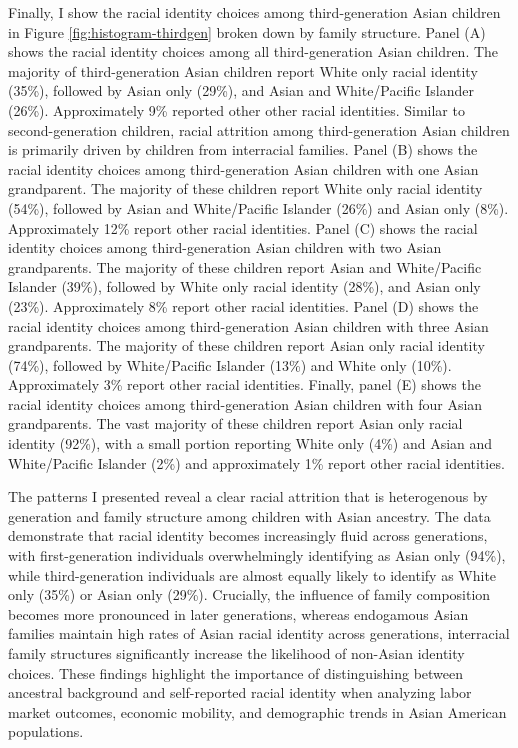 Finally, I show the racial identity choices among third-generation Asian children in Figure \ref{fig:histogram-thirdgen} broken down by family structure. Panel (A) shows the racial identity choices among all third-generation Asian children. The majority of third-generation Asian children report White only racial identity (35\%), followed by Asian only (29\%), and Asian and White/Pacific Islander (26\%). Approximately 9\% reported other other racial identities. Similar to second-generation children, racial attrition among third-generation Asian children is primarily driven by children from interracial families. Panel (B) shows the racial identity choices among third-generation Asian children with one Asian grandparent. The majority of these children report White only racial identity (54\%), followed by Asian and White/Pacific Islander (26\%) and Asian only (8\%). Approximately 12\% report other racial identities. Panel (C) shows the racial identity choices among third-generation Asian children with two Asian grandparents. The majority of these children report Asian and White/Pacific Islander (39\%), followed by White only racial identity (28\%), and Asian only (23\%). Approximately 8\% report other racial identities. Panel (D) shows the racial identity choices among third-generation Asian children with three Asian grandparents. The majority of these children report Asian only racial identity (74\%), followed by White/Pacific Islander (13\%) and White only (10\%). Approximately 3\% report other racial identities. Finally, panel (E) shows the racial identity choices among third-generation Asian children with four Asian grandparents. The vast majority of these children report Asian only racial identity (92\%), with a small portion reporting White only (4\%) and Asian and White/Pacific Islander (2\%) and approximately 1\% report other racial identities.

The patterns I presented reveal a clear racial attrition that is heterogenous by generation and family structure among children with Asian ancestry. The data demonstrate that racial identity becomes increasingly fluid across generations, with first-generation individuals overwhelmingly identifying as Asian only (94\%), while third-generation individuals are almost equally likely to identify as White only (35\%) or Asian only (29\%). Crucially, the influence of family composition becomes more pronounced in later generations, whereas endogamous Asian families maintain high rates of Asian racial identity across generations, interracial family structures significantly increase the likelihood of non-Asian identity choices. These findings highlight the importance of distinguishing between ancestral background and self-reported racial identity when analyzing labor market outcomes, economic mobility, and demographic trends in Asian American populations.

